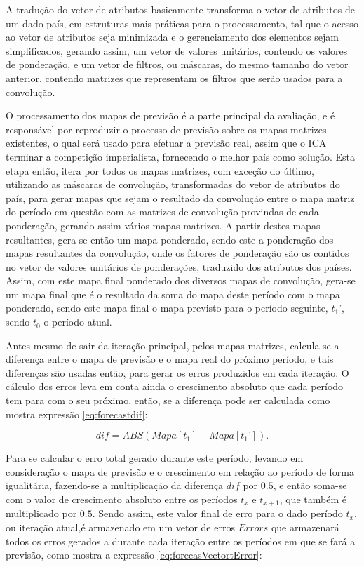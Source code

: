 A tradução do vetor de atributos basicamente transforma o vetor de atributos de um dado país, em estruturas mais práticas para o processamento, tal que o acesso ao vetor de atributos seja minimizada e o gerenciamento dos elementos sejam simplificados, gerando assim, um vetor de valores unitários, contendo os valores de ponderação, e um vetor de filtros, ou máscaras, do mesmo tamanho do vetor anterior, contendo matrizes que representam os filtros que serão usados para a convolução.   

O processamento dos mapas de previsão é a parte principal da avaliação, e é responsável por reproduzir o processo de previsão sobre os mapas matrizes existentes, o qual será usado para efetuar a previsão real, assim que o ICA terminar a competição imperialista, fornecendo o melhor país como solução. Esta etapa então, itera por todos os mapas matrizes, com exceção do último, utilizando as máscaras de convolução, transformadas do vetor de atributos do país, para gerar mapas que sejam o resultado da convolução entre o mapa matriz do período em questão com as matrizes de convolução provindas de cada ponderação, gerando assim vários mapas matrizes. A partir destes mapas resultantes, gera-se então um mapa ponderado, sendo este a ponderação dos mapas resultantes da convolução, onde os fatores de ponderação são os contidos no vetor de valores unitários de ponderações, traduzido dos atributos dos países. Assim, com este mapa final ponderado dos diversos mapas de convolução, gera-se um mapa final que é o resultado da soma do mapa deste período com o mapa ponderado, sendo este mapa final o mapa previsto para o período seguinte, \(t_1’\), sendo \(t_0\) o período atual. 

Antes mesmo de sair da iteração principal, pelos mapas matrizes, calcula-se a diferença entre o mapa de previsão e o mapa real do próximo período, e tais diferenças são usadas então, para gerar os erros produzidos em cada iteração. O cálculo dos erros leva em conta ainda o crescimento absoluto que cada período tem para com o seu próximo, então, se a diferença pode ser calculada como mostra expressão \ref{eq:forecastdif}:

\begin{equation}
\label{eq:forecastdif}
dif = ABS( Mapa[t_1] - Mapa[t_1’] ).
\end{equation}
	
Para se calcular o erro total gerado durante este período, levando em consideração o mapa de previsão e o crescimento em relação ao período de forma igualitária, fazendo-se a multiplicação da diferença \(dif\) por \(0.5\), e então soma-se com o valor de crescimento absoluto entre os períodos \(t_x\) e \(t_{x+1}\), que também é multiplicado por \(0.5\). Sendo assim, este valor final de erro para o dado período \(t_x\), ou iteração atual,é armazenado em um vetor de erros \(Errors\) que armazenará todos os erros gerados a durante cada iteração entre os períodos em que se fará a previsão, como mostra a expressão \ref{eq:forecasVectortError}:


